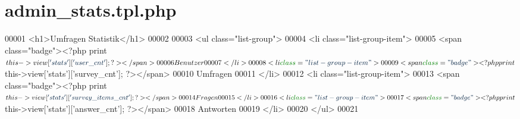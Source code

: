 \hypertarget{admin__stats_8tpl_8php}{\section{admin\-\_\-stats.\-tpl.\-php}
\label{admin__stats_8tpl_8php}
}

\begin{DoxyCode}
00001                 <h1>Umfragen Statistik</h1>
00002 
00003                 <ul \textcolor{keyword}{class}=\textcolor{stringliteral}{"list-group"}>
00004                         <li \textcolor{keyword}{class}=\textcolor{stringliteral}{"list-group-item"}>
00005                         <span \textcolor{keyword}{class}=\textcolor{stringliteral}{"badge"}><?php print $this->view[\textcolor{stringliteral}{'stats'}][\textcolor{stringliteral}{'user\_cnt'}]; ?></span>
00006                         Benutzer
00007                         </li>
00008                         <li \textcolor{keyword}{class}=\textcolor{stringliteral}{"list-group-item"}>
00009                         <span \textcolor{keyword}{class}=\textcolor{stringliteral}{"badge"}><?php print $this->view[\textcolor{stringliteral}{'stats'}][\textcolor{stringliteral}{'survey\_cnt'}]; ?></span>
00010                         Umfragen
00011                         </li>
00012                         <li \textcolor{keyword}{class}=\textcolor{stringliteral}{"list-group-item"}>
00013                         <span \textcolor{keyword}{class}=\textcolor{stringliteral}{"badge"}><?php print $this->view[\textcolor{stringliteral}{'stats'}][\textcolor{stringliteral}{'survey\_items\_cnt'}]; ?></span>
00014                         Fragen
00015                         </li>                   
00016                         <li \textcolor{keyword}{class}=\textcolor{stringliteral}{"list-group-item"}>
00017                         <span \textcolor{keyword}{class}=\textcolor{stringliteral}{"badge"}><?php print $this->view[\textcolor{stringliteral}{'stats'}][\textcolor{stringliteral}{'answer\_cnt'}]; ?></span>
00018                         Antworten
00019                         </li>
00020                 </ul>
00021                 
\end{DoxyCode}
